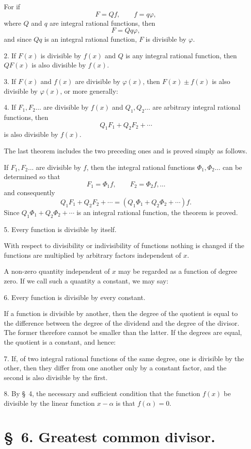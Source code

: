 \documentclass[11pt]{article}
\begin{document}
For if
\[
 F=Qf,
 \qquad
 f=q\varphi,
\]
where $Q$ and $q$ are integral rational functions, then
\[
 F=Qq\varphi,
\]
and since $Qq$ is an integral rational function, $F$ is divisible by $\varphi$.

2. If $F(x)$ is divisible by $f(x)$ and $Q$ is any integral rational function, then $QF(x)$ is also divisible by $f(x)$.

3. If $F(x)$ and $f(x)$ are divisible by $\varphi(x)$, then $F(x)\pm f(x)$ is also divisible by $\varphi(x)$, or more generally:

4. If $F_1,F_2\ldots$ are divisible by $f(x)$ and $Q_1,Q_2\ldots$ are arbitrary integral rational functions, then
\[
 Q_1F_1+Q_2F_2+\cdots
\]
is also divisible by $f(x)$.

The last theorem includes the two preceding ones and is proved simply as follows.

If $F_1,F_2\ldots$ are divisible by $f$, then the integral rational functions $\Phi_1,\Phi_2\ldots$ can be determined so that
\[
 F_1=\Phi_1f,
 \qquad
 F_2=\Phi_2f,\ldots
\]
and consequently
\[
 Q_1F_1+Q_2F_2+\cdots=(Q_1\Phi_1+Q_2\Phi_2+\cdots)f.
\]
Since $Q_1\Phi_1+Q_2\Phi_2+\cdots$ is an integral rational function, the theorem is proved.

5. Every function is divisible by itself.

With respect to divisibility or indivisibility of functions nothing is changed if the functions are multiplied by arbitrary factors independent of $x$.

A non-zero quantity independent of $x$ may be regarded as a function of degree zero. If we call such a quantity a constant, we may say:

6. Every function is divisible by every constant.

If a function is divisible by another, then the degree of the quotient is equal to the difference between the degree of the dividend and the degree of the divisor. The former therefore cannot be smaller than the latter. If the degrees are equal, the quotient is a constant, and hence:

7. If, of two integral rational functions of the same degree, one is divisible by the other, then they differ from one another only by a constant factor, and the second is also divisible by the first.

8. By \S~4, the necessary and sufficient condition that the function $f(x)$ be divisible by the linear function $x-\alpha$ is that $f(\alpha)=0$.

\section*{\S~6. Greatest common divisor.}
\end{document}
